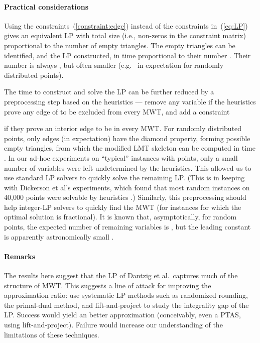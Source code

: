 \documentclass[final]{siamltex}
\newcommand{\refLP}{(\ref{eq:LP})\xspace}
\begin{document}
\paragraph{Practical considerations}
Using the  constraints~(\ref{constraint:edge})  
instead of the constraints in~\refLP gives an equivalent LP
with total size (i.e., non-zeros in the constraint matrix) 
proportional to the number of empty triangles.
The empty triangles can be identified, and the LP constructed, 
in time proportional to their number \cite{dobkin1990searching}.
Their number is always , 
but often smaller (e.g.~ in expectation for randomly distributed points).

The time to construct and solve the LP can be further reduced 
by a preprocessing step based on the heuristics
--- 
remove any variable  if the heuristics prove any edge of  to be excluded from every MWT,
and add a constraint
 
if they prove an interior edge  to be in every MWT.
For randomly distributed points,
only  edges (in expectation) have the diamond property,
forming  possible empty triangles,
from which the modified LMT skeleton can be computed in  time
\cite{dickerson1997large,dickerson1997fast}.
In our ad-hoc experiments on ``typical'' instances with  points,
only a small number of variables were left undetermined by the heuristics.
This allowed us to use standard LP solvers to quickly solve the remaining LP.
(This is in keeping with Dickerson et al's experiments, which found that most random
instances on 40,000 points were solvable by heuristics \cite{dickerson1997large}.)
Similarly, this preprocessing
should help integer-LP solvers to quickly find the MWT
(for instances for which the optimal solution is fractional).
It is known that, asymptotically, 
for  random points, the expected number of remaining variables
is , but the leading constant is apparently astronomically small
\cite{bose2002diamonds}.




\paragraph{Remarks} 
The results here suggest that the LP of Dantzig et al.\ captures
much of the structure of MWT.
This suggests a line of attack for improving the approximation ratio:
use systematic LP methods such as randomized rounding, the primal-dual method,
and lift-and-project \cite{balas2002lift} to study the integrality gap of the LP.
Success would yield an better approximation (conceivably, even a PTAS, using lift-and-project).
Failure would increase our understanding of the limitations of these techniques.
\end{document}
